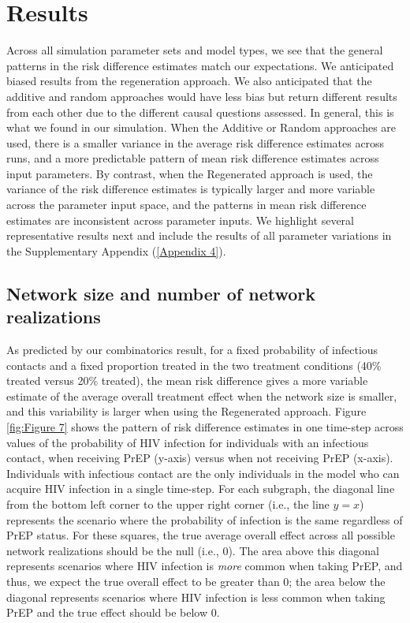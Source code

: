 \documentclass{article}
\theoremstyle{definition}
\begin{document}
\section{Results}


Across all simulation parameter sets and model types, we see that the general patterns in the risk difference estimates match our expectations. We anticipated biased results from the regeneration approach. We also anticipated that the additive and random approaches would have less bias but return different results from each other due to the different causal questions assessed. In general, this is what we found in our simulation. When the Additive or Random approaches are used, there is a smaller variance in the average risk difference estimates across runs, and a more predictable pattern of mean risk difference estimates across input parameters. By contrast, when the Regenerated approach is used, the variance of the risk difference estimates is typically larger and more variable across the parameter input space, and the patterns in mean risk difference estimates are inconsistent across parameter inputs. We highlight several representative results next and include the results of all parameter variations in the Supplementary Appendix (\ref{Appendix 4}).

\subsection{Network size and number of network realizations}
As predicted by our combinatorics result, for a fixed probability of infectious contacts and a fixed proportion treated in the two treatment conditions (40\% treated versus 20\% treated), the mean risk difference gives a more variable estimate of the average overall treatment effect when the network size is smaller, and this variability is larger when using the Regenerated approach. Figure \ref{fig:Figure 7} shows the pattern of risk difference estimates in one time-step across values of the probability of HIV infection for individuals with an infectious contact, when receiving PrEP (y-axis) versus when not receiving PrEP (x-axis). Individuals with infectious contact are the only individuals in the model who can acquire HIV infection in a single time-step. For each subgraph, the diagonal line from the bottom left corner to the upper right corner (i.e., the line $y=x$) represents the scenario where the probability of infection is the same regardless of PrEP status. For these squares, the true average overall effect across all possible network realizations should be the null (i.e., 0). The area above this diagonal represents scenarios where HIV infection is \textit{more} common when taking PrEP, and thus, we expect the true overall effect to be greater than 0; the area below the diagonal represents scenarios where HIV infection is less common when taking PrEP and the true effect should be below 0. 
\end{document}
